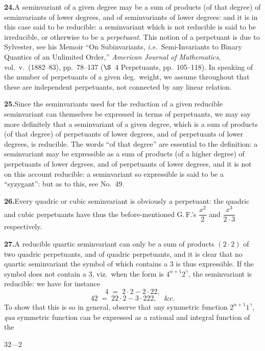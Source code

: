 \documentclass[11pt]{article}
\begin{document}
\medskip
\noindent\textbf{24.}\quad A seminvariant of a given degree may be a sum of products
(of that degree) of seminvariants of lower degrees, and of seminvariants of lower
degrees: and it is in this case said to be reducible: a seminvariant which is not
reducible is said to be irreducible, or otherwise to be a \textit{perpetuant}. This
notion of a perpetuant is due to Sylvester, see his Memoir ``On Subinvariants, \textit{i.e.}\
Semi-Invariants to Binary Quantics of an Unlimited Order,'' \textit{American Journal of
Mathematics}, vol.\ v.\ (1882--83), pp.\ 78--137 ($\S$~4 Perpetuants, pp.\ 105--118).
In speaking of the number of perpetuants of a given deg.\ weight, we assume throughout
that these are independent perpetuants, not connected by any linear relation.

\medskip
\noindent\textbf{25.}\quad Since the seminvariants used for the reduction of a given
reducible seminvariant can themselves be expressed in terms of perpetuants, we may
say more definitely that a seminvariant of a given degree, which is a sum of products
(of that degree) of perpetuants of lower degrees, and of perpetuants of lower degrees,
is reducible. The words ``of that degree'' are essential to the definition: a
seminvariant may be expressible as a sum of products (of a higher degree) of
perpetuants of lower degrees, and of perpetuants of lower degrees, and it is not on
this account reducible: a seminvariant so expressible is said to be a ``syzygant'':
but as to this, see No.\ 49.

\medskip
\noindent\textbf{26.}\quad Every quadric or cubic seminvariant is obviously a
perpetuant: the quadric and cubic perpetuants have thus the before-mentioned
G.\,F.'s $\dfrac{x^{2}}{2}$ and $\dfrac{x^{3}}{2\cdot 3}$ respectively.

\medskip
\noindent\textbf{27.}\quad A reducible quartic seminvariant can only be a sum of
products $(2\cdot 2)$ of two quadric perpetuants, and of quadric perpetuants, and it
is clear that no quartic seminvariant the symbol of which contains a $3$ is thus
expressible. If the symbol does not contain a $3$, viz.\ when the form is
$4^{\alpha+1}2^{\gamma}$, the seminvariant is reducible: we have for instance
\[
4 \;=\; 2\cdot 2 - 2\cdot 22,
\]
\[
42 \;=\; 22\cdot 2 - 3\cdot 222,\quad\&\text{c.}
\]
To show that this is so in general, observe that any symmetric function $2^{\alpha+1}1^{\gamma}$,
\textit{qua} symmetric function can be expressed as a rational and integral function
of the

\hfill $32$---$2$
\end{document}
